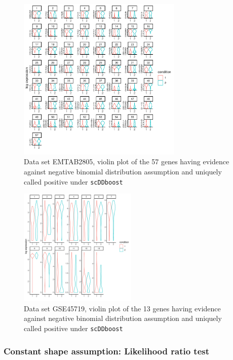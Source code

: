 \documentclass[aoas,preprint]{imsart}
\begin{document}
\begin{figure}[h]
\includegraphics[width = 0.7\textwidth]{Figs/NBgene.pdf}
\caption{Data set EMTAB2805, violin plot of the 57 genes having evidence against negative binomial distribution assumption and uniquely called positive under \texttt{scDDboost}}
\label{fig:s11}
\end{figure}

\begin{figure}[h]
\includegraphics[width = 0.5\textwidth]{Figs/NBgene2.pdf}
\caption{Data set GSE45719, violin plot of the 13 genes having evidence against negative binomial distribution assumption and uniquely called positive under \texttt{scDDboost}}
\label{fig:s12}
\end{figure}


\subsubsection{Constant shape assumption: Likelihood ratio test}
\end{document}
